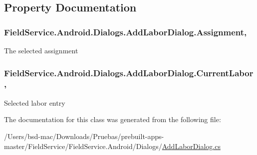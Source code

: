 \subsection{Property Documentation}
\hypertarget{class_field_service_1_1_android_1_1_dialogs_1_1_add_labor_dialog_ad165744da418abc55f4c649365d06791}{
\subsubsection[{Assignment}]{ Field\+Service.\+Android.\+Dialogs.\+Add\+Labor\+Dialog.\+Assignment\hspace{0.3cm}{\ttfamily [get]}, {\ttfamily [set]}}}\label{class_field_service_1_1_android_1_1_dialogs_1_1_add_labor_dialog_ad165744da418abc55f4c649365d06791}


The selected assignment 

\hypertarget{class_field_service_1_1_android_1_1_dialogs_1_1_add_labor_dialog_ae71d142ea9c1d444a703b56cdcb4658b}{
\subsubsection[{Current\+Labor}]{ Field\+Service.\+Android.\+Dialogs.\+Add\+Labor\+Dialog.\+Current\+Labor\hspace{0.3cm}{\ttfamily [get]}, {\ttfamily [set]}}}\label{class_field_service_1_1_android_1_1_dialogs_1_1_add_labor_dialog_ae71d142ea9c1d444a703b56cdcb4658b}


Selected labor entry 



The documentation for this class was generated from the following file\+:\begin{DoxyCompactItemize}
\item 
/\+Users/bsd-\/mac/\+Downloads/\+Pruebas/prebuilt-\/apps-\/master/\+Field\+Service/\+Field\+Service.\+Android/\+Dialogs/\hyperlink{_add_labor_dialog_8cs}{Add\+Labor\+Dialog.\+cs}\end{DoxyCompactItemize}
